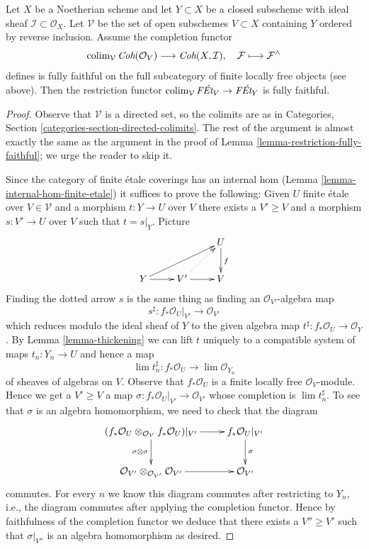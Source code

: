 \begin{lemma}
\label{lemma-restriction-fully-faithful-general}
Let $X$ be a Noetherian scheme and let $Y \subset X$ be a closed subscheme
with ideal sheaf $\mathcal{I} \subset \mathcal{O}_X$.
Let $\mathcal{V}$ be the set of open subschemes $V \subset X$ containing $Y$
ordered by reverse inclusion. Assume the completion functor
$$
\mathop{\mathrm{colim}}\nolimits_\mathcal{V} \textit{Coh}(\mathcal{O}_V)
\longrightarrow
\textit{Coh}(X, \mathcal{I}),
\quad
\mathcal{F} \longmapsto \mathcal{F}^\wedge
$$
defines is fully faithful on the full subcategory of
finite locally free objects (see above).
Then the restriction functor
$\mathop{\mathrm{colim}}\nolimits_\mathcal{V} \textit{F\'Et}_V \to \textit{F\'Et}_Y$
is fully faithful.
\end{lemma}

\begin{proof}
Observe that $\mathcal{V}$ is a directed set, so the colimits are
as in Categories, Section \ref{categories-section-directed-colimits}.
The rest of the argument is almost exactly the same as the argument
in the proof of Lemma \ref{lemma-restriction-fully-faithful}; we urge
the reader to skip it.

\medskip\noindent
Since the category of finite \'etale coverings has an
internal hom (Lemma \ref{lemma-internal-hom-finite-etale})
it suffices to prove the following: Given $U$ finite \'etale over
$V \in \mathcal{V}$
and a morphism $t : Y \to U$ over $V$ there exists a $V' \geq V$
and a morphism $s : V' \to U$ over $V$ such that $t = s|_Y$. Picture
$$
\xymatrix{
& & U \ar[d]^f \\
Y \ar[r] \ar[rru] & V' \ar@{..>}[ru] \ar[r] & V
}
$$
Finding the dotted arrow $s$ is the same thing as finding an
$\mathcal{O}_{V'}$-algebra map
$$
s^\sharp : f_*\mathcal{O}_U|_{V'} \longrightarrow \mathcal{O}_{V'}
$$
which reduces modulo the ideal sheaf of $Y$ to the given algebra map
$t^\sharp : f_*\mathcal{O}_U \to \mathcal{O}_Y$.
By Lemma \ref{lemma-thickening} we can lift $t$ uniquely to a compatible
system of maps $t_n : Y_n \to U$ and hence a map
$$
\lim t_n^\sharp : f_*\mathcal{O}_U \longrightarrow \lim \mathcal{O}_{Y_n}
$$
of sheaves of algebras on $V$.
Observe that $f_*\mathcal{O}_U$ is a finite locally free
$\mathcal{O}_V$-module. Hence we get a $V' \geq V$ a map
$\sigma : f_*\mathcal{O}_U|_{V'} \to \mathcal{O}_{V'}$
whose completion is $\lim t_n^\sharp$.
To see that $\sigma$ is an algebra homomorphism, we need to check
that the diagram
$$
\xymatrix{
(f_*\mathcal{O}_U \otimes_{\mathcal{O}_V} f_*\mathcal{O}_U)|_{V'}
\ar[r] \ar[d]_{\sigma \otimes \sigma} &
f_*\mathcal{O}_U|_{V'} \ar[d]^\sigma \\
\mathcal{O}_{V'} \otimes_{\mathcal{O}_{V'}} \mathcal{O}_{V'} \ar[r] &
\mathcal{O}_{V'}
}
$$
commutes. For every $n$ we know this diagram commutes after restricting
to $Y_n$, i.e., the diagram commutes after applying the completion functor.
Hence by faithfulness of the completion functor
we deduce that there exists a $V'' \geq V'$ such that
$\sigma|_{V''}$ is an algebra homomorphism as desired.
\end{proof}

